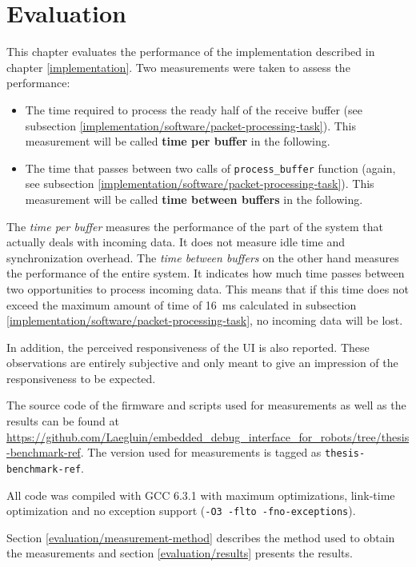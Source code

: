 \chapter{Evaluation}
\label{evaluation}

This chapter evaluates the performance of the implementation described in chapter \ref{implementation}.
Two measurements were taken to assess the performance:

\begin{itemize}
    \item The time required to process the ready half of the receive buffer (see subsection
          \ref{implementation/software/packet-processing-task}). This measurement will be called
          \textbf{time per buffer} in the following.
    \item The time that passes between two calls of \lstinline{process_buffer} function (again, see
          subsection \ref{implementation/software/packet-processing-task}). This measurement will be
          called \textbf{time between buffers} in the following.
\end{itemize}

The \textit{time per buffer} measures the performance of the part of the system that actually deals
with incoming data. It does not measure idle time and synchronization overhead. The
\textit{time between buffers} on the other hand measures the performance of the entire system. It
indicates how much time passes between two opportunities to process incoming data. This means that
if this time does not exceed the maximum amount of time of \SI{16}{\milli\second} calculated in
subsection \ref{implementation/software/packet-processing-task}, no incoming data will be lost.

In addition, the perceived responsiveness of the UI is also reported. These observations are entirely
subjective and only meant to give an impression of the responsiveness to be expected.

The source code of the firmware and scripts used for measurements as well as the results can be found
at \url{https://github.com/Laegluin/embedded_debug_interface_for_robots/tree/thesis-benchmark-ref}.
The version used for measurements is tagged as \lstinline{thesis-benchmark-ref}.

All code was compiled with GCC 6.3.1 with maximum optimizations, link-time optimization and no
exception support (\lstinline{-O3 -flto -fno-exceptions}).

Section \ref{evaluation/measurement-method} describes the method used to obtain the measurements and
section \ref{evaluation/results} presents the results.

